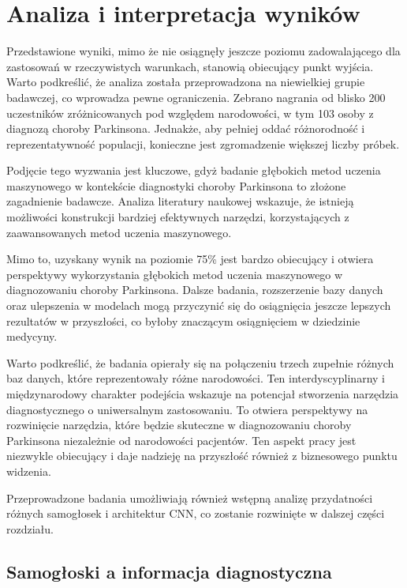 \chapter{Analiza i interpretacja wyników\@}
\label{ch:interpretacja-wynikow}

Przedstawione wyniki, mimo że nie osiągnęły jeszcze poziomu zadowalającego dla zastosowań w rzeczywistych warunkach, stanowią obiecujący punkt wyjścia.
Warto podkreślić, że analiza została przeprowadzona na niewielkiej grupie badawczej, co wprowadza pewne ograniczenia.
Zebrano nagrania od blisko 200 uczestników zróżnicowanych pod względem narodowości, w tym 103 osoby z diagnozą choroby Parkinsona.
Jednakże, aby pełniej oddać różnorodność i reprezentatywność populacji, konieczne jest zgromadzenie większej liczby próbek.

Podjęcie tego wyzwania jest kluczowe, gdyż badanie głębokich metod uczenia maszynowego w kontekście diagnostyki choroby Parkinsona to złożone zagadnienie badawcze.
Analiza literatury naukowej wskazuje, że istnieją możliwości konstrukcji bardziej efektywnych narzędzi, korzystających z zaawansowanych metod uczenia maszynowego.

Mimo to, uzyskany wynik na poziomie 75\% jest bardzo obiecujący i otwiera perspektywy wykorzystania głębokich metod uczenia maszynowego w diagnozowaniu choroby Parkinsona.
Dalsze badania, rozszerzenie bazy danych oraz ulepszenia w modelach mogą przyczynić się do osiągnięcia jeszcze lepszych rezultatów w przyszłości, co byłoby znaczącym osiągnięciem w dziedzinie medycyny.

Warto podkreślić, że badania opierały się na połączeniu trzech zupełnie różnych baz danych, które reprezentowały różne narodowości.
Ten interdyscyplinarny i międzynarodowy charakter podejścia wskazuje na potencjał stworzenia narzędzia diagnostycznego o uniwersalnym zastosowaniu.
To otwiera perspektywy na rozwinięcie narzędzia, które będzie skuteczne w diagnozowaniu choroby Parkinsona niezależnie od narodowości pacjentów.
Ten aspekt pracy jest niezwykle obiecujący i daje nadzieję na przyszłość również z biznesowego punktu widzenia.

Przeprowadzone badania umożliwiają również wstępną analizę przydatności różnych samogłosek i architektur CNN, co zostanie rozwinięte w dalszej części rozdziału.

\section{Samogłoski a informacja diagnostyczna\@}
\label{sec:samogloski-informacja-diagnostyczna}

